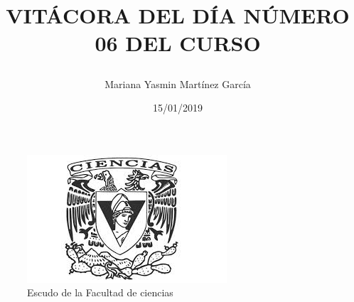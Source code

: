 \documentclass{article}
\title{\Huge\item\color{blue}\textbf{VITÁCORA DEL DÍA NÚMERO 06 DEL CURSO}}
\author{\Large Mariana Yasmin Martínez García}
\date{\Large 15/01/2019}
\begin{document}
\begin{figure}[t]
	\centering
	\includegraphics[width=0.4\linewidth]{Imagenes/1}
	\caption{Escudo de la Facultad de ciencias}
	\label{fig:1}
\end{figure}
	\maketitle
		
	\newpage
	
\end{document}
